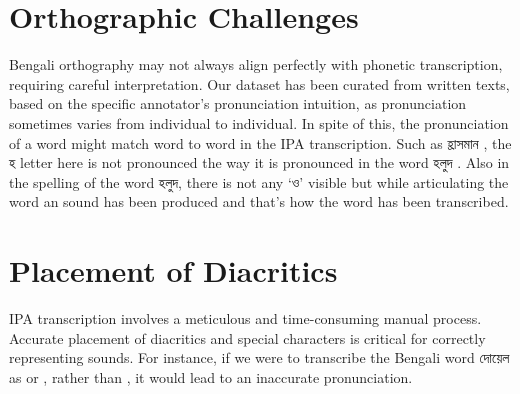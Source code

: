 \section{Orthographic Challenges}
Bengali orthography may not always align perfectly with phonetic transcription, requiring careful interpretation. Our dataset has been curated from written texts, based on the specific annotator's pronunciation intuition, as pronunciation sometimes varies from individual to individual. In spite of this, the pronunciation of a word might match word to word in the IPA transcription. Such as \textbengali{হ্রাসমান} , the \textbengali{হ} letter here is not pronounced the way it is pronounced in the word \textbengali{হলুদ} . Also in the spelling of the word \textbengali{হলুদ}, there is not any \textbengali{‘ও’} visible but while articulating the word an  sound has been produced and that’s how the word has been transcribed. 

\section{Placement of Diacritics}
IPA transcription involves a meticulous and time-consuming manual process. Accurate placement of diacritics and special characters is critical for correctly representing sounds. For instance, if we were to transcribe the Bengali word \textbengali{দোয়েল} as  or , rather than , it would lead to an inaccurate pronunciation.



